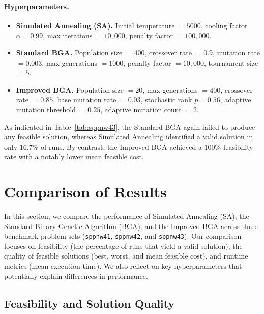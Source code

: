 \documentclass[12pt]{article}
\begin{document}
\paragraph{Hyperparameters.}
\vspace{-1em}
\begin{itemize}
    \item \textbf{Simulated Annealing (SA).}
    Initial temperature $= 5000$, 
    cooling factor $\alpha = 0.99$, 
    max iterations $= 10{,}000$, 
    penalty factor $= 100{,}000$. 
    
    \item \textbf{Standard BGA.}
    Population size $= 400$, 
    crossover rate $= 0.9$, 
    mutation rate $= 0.003$, 
    max generations $= 1000$, 
    penalty factor $= 10{,}000$, 
    tournament size $= 5$. 
    
    \item \textbf{Improved BGA.}
    Population size $= 20$, 
    max generations $= 400$, 
    crossover rate $= 0.85$, 
    base mutation rate $= 0.03$, 
    stochastic rank $p = 0.56$, 
    adaptive mutation threshold $= 0.25$, 
    adaptive mutation count $= 2$.
\end{itemize}

\noindent
As indicated in Table~\ref{tab:sppnw43}, the Standard BGA again failed to produce any feasible solution, whereas Simulated Annealing identified a valid solution in only $16.7\%$ of runs. By contrast, the Improved BGA achieved a $100\%$ feasibility rate with a notably lower mean feasible cost.

\section{Comparison of Results}
\label{sec:comparison}

In this section, we compare the performance of Simulated Annealing (SA), the Standard Binary Genetic Algorithm (BGA), and the Improved BGA across three benchmark problem sets (\texttt{sppnw41}, \texttt{sppnw42}, and \texttt{sppnw43}). Our comparison focuses on feasibility (the percentage of runs that yield a valid solution), the quality of feasible solutions (best, worst, and mean feasible cost), and runtime metrics (mean execution time). We also reflect on key hyperparameters that potentially explain differences in performance.

\subsection{Feasibility and Solution Quality}
\end{document}
